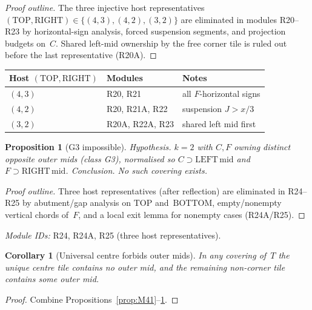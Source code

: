 \documentclass[11pt,reqno]{amsart}
\newtheorem{proposition}[theorem]{Proposition}
\newtheorem{corollary}[theorem]{Corollary}
\theoremstyle{definition}
\newcommand{\BOTTOM}{\mathrm{BOTTOM}}
\newcommand{\RIGHT}{\mathrm{RIGHT}}
\newcommand{\TOP}{\mathrm{TOP}}
\begin{document}
\begin{proof}[Proof outline]
The three injective host representatives
$(\TOP,\RIGHT)\in\{(4,3),(4,2),(3,2)\}$ are eliminated in modules R20--R23 by
horizontal-sign analysis, forced suspension segments, and projection budgets
on~$C$.  Shared left-mid ownership by the free corner tile is ruled out before
the last representative (R20A).
\end{proof}

\begin{center}
\small
\begin{tabular}{@{}lll@{}}
\toprule
Host $(\TOP,\RIGHT)$ & Modules & Notes \\
\midrule
$(4,3)$ & R20, R21 & all $F$-horizontal signs \\
$(4,2)$ & R20, R21A, R22 & suspension $J>x/3$ \\
$(3,2)$ & R20A, R22A, R23 & shared left mid first \\
\bottomrule
\end{tabular}
\end{center}

\begin{proposition}[G3 impossible]\label{prop:M52}
\emph{Hypothesis.} $k=2$ with $C,F$ owning distinct \emph{opposite} outer mids
(class G3), normalised so $C\supset\mathrm{LEFT\,mid}$ and
$F\supset\mathrm{RIGHT\,mid}$.
\emph{Conclusion.} No such covering exists.
\end{proposition}

\begin{proof}[Proof outline]
Three host representatives (after reflection) are eliminated in R24--R25 by
abutment/gap analysis on $\TOP$ and~$\BOTTOM$, empty/nonempty vertical chords
of~$F$, and a local exit lemma for nonempty cases (R24A/R25).
\end{proof}

\noindent\textit{Module IDs:} R24, R24A, R25 (three host representatives).

\begin{corollary}[Universal centre forbids outer mids]\label{cor:M53}
In any covering of~$T$ the unique centre tile contains no outer mid, and the
remaining non-corner tile contains some outer mid.
\end{corollary}

\begin{proof}
Combine Propositions~\ref{prop:M41}--\ref{prop:M52}.
\end{proof}

\end{document}
